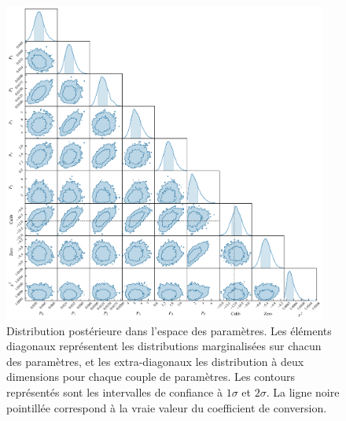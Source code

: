\begin{figure}[p]
    \centering
    \includegraphics[width=0.95\textwidth]{Figures/Chap_panco/demo_plots/corner.pdf}
    \caption{
        Distribution postérieure dans l'espace des paramètres.
        Les éléments diagonaux représentent les distributions marginalisées sur chacun des paramètres, et les extra-diagonaux les distribution à deux dimensions pour chaque couple de paramètres.
        Les contours représentés sont les intervalles de confiance à $1\sigma$ et $2\sigma$.
        La ligne noire pointillée correspond à la vraie valeur du coefficient de conversion.
    }
    \label{fig:panco2:actlike_corner}
\end{figure}


